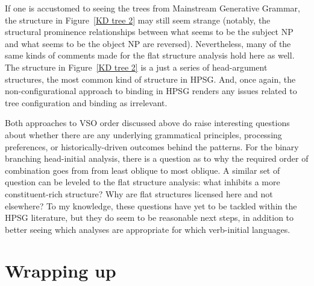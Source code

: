 \documentclass[output=paper,biblatex,babelshorthands,newtxmath,draftmode,colorlinks,citecolor=brown]{langscibook}
\begin{document}
If one is accustomed to seeing the trees from Mainstream Generative Grammar, the structure in Figure~\ref{KD tree 2} may still seem strange (notably, the structural prominence relationships between what seems to be the subject NP and what seems to be the object NP are reversed). Nevertheless, many of the same kinds of comments made for the flat structure analysis hold here as well. The structure in Figure~\ref{KD tree 2} is a just a series of head-argument structures, the most common kind of structure in HPSG. And, once again, the non-configurational approach to binding in HPSG renders any issues related to tree configuration and binding as irrelevant.    

Both approaches to VSO order discussed above do raise interesting questions about whether there are any underlying grammatical principles, processing preferences, or historically-driven outcomes behind the patterns. For the binary branching head-initial analysis, there is a question as to why the required order of combination goes from from least oblique to most oblique. A similar set of question can be leveled to the flat structure analysis: what inhibits a more constituent-rich structure? Why are flat structures licensed here and not elsewhere? To my knowledge, these questions have yet to be tackled within the HPSG literature, but they do seem to be reasonable next steps, in addition to better seeing which analyses are appropriate for which verb-initial languages. 
	
\section{Wrapping up}
\end{document}
